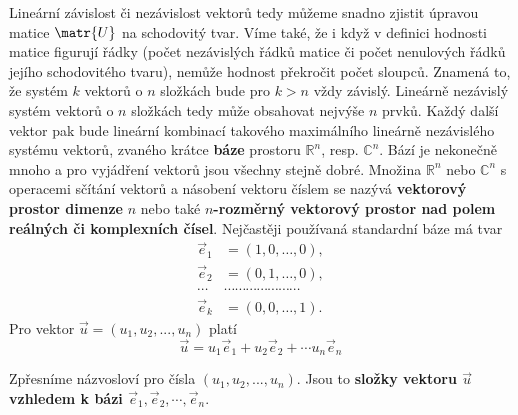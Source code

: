       Lineární závislost či nezávislost vektorů tedy můžeme snadno zjistit úpravou matice
      \(\matr{U}\) na schodovitý tvar. Víme také, že i když v definici hodnosti matice figurují
      řádky (počet nezávislých řádků matice či počet nenulových řádků jejího schodovitého tvaru),
      nemůže hodnost překročit počet sloupců. Znamená to, že systém \(k\) vektorů o \(n\) složkách
      bude pro \(k > n\) vždy závislý. Lineárně nezávislý systém vektorů o \(n\) složkách tedy může
      obsahovat nejvýše \(n\) prvků. Každý další vektor pak bude lineární kombinací takového
      maximálního lineárně nezávislého systému vektorů, zvaného krátce \textbf{báze} prostoru
      \(\mathbb{R}^n\), resp. \(\mathbb{C}^n\). Bází je nekonečně mnoho a pro vyjádření vektorů jsou
      všechny stejně dobré. Množina \(\mathbb{R}^n\) nebo \(\mathbb{C}^n\) s operacemi sčítání
      vektorů a násobení vektoru číslem se nazývá \textbf{vektorový prostor dimenze} \(n\) nebo také
      \textbf{\(n\)-rozměrný vektorový prostor nad polem reálných či komplexních čísel}. Nejčastěji
      používaná standardní báze má tvar
      \begin{align*}
        \vec{e}_1 &= (1, 0, \ldots, 0),   \\
        \vec{e}_2 &= (0, 1, \ldots, 0),   \\
        \cdots    &\cdots\cdots\cdots\cdots\cdots\cdots\cdots \\
        \vec{e}_k &= (0, 0, \ldots, 1).
      \end{align*}
      Pro vektor \(\vec{u} = (u_1, u_2, ..., u_n)\) platí
      \begin{equation*}
        \vec{u} = u_1\vec{e}_1 + u_2\vec{e}_2 + \cdots u_n\vec{e}_n
      \end{equation*}
      
      Zpřesníme názvosloví pro čísla \((u_1, u_2, ..., u_n)\). Jsou to \textbf{složky vektoru
      \(\vec{u}\) vzhledem k bázi \(\vec{e}_1, \vec{e}_2, \cdots, \vec{e}_n\)}. 
      

